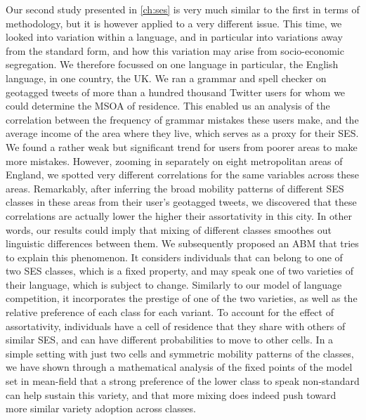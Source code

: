 \documentclass[../thesis.tex]{subfiles}
\begin{document}
Our second study presented in \cref{ch:ses} is very much similar to the first in terms
of methodology, but it is however applied to a very different issue. This time, we
looked into variation within a language, and in particular into variations away from the
standard form, and how this variation may arise from socio-economic segregation. We
therefore focussed on one language in particular, the English language, in one country,
the UK. We ran a grammar and spell checker on geotagged tweets of more than a hundred
thousand Twitter users for whom we could determine the \ac{MSOA} of residence. This
enabled us an analysis of the correlation between the frequency of grammar mistakes
these users make, and the average income of the area where they live, which serves as a
proxy for their \ac{SES}. We found a rather weak but significant trend for users from
poorer areas to make more mistakes. However, zooming in separately on eight metropolitan
areas of England, we spotted very different correlations for the same variables across
these areas. Remarkably, after inferring the broad mobility patterns of different
\ac{SES} classes in these areas from their user's geotagged tweets, we discovered that
these correlations are actually lower the higher their assortativity in this city. In
other words, our results could imply that mixing of different classes smoothes out
linguistic differences between them. We subsequently proposed an \ac{ABM} that tries to
explain this phenomenon. It considers individuals that can belong to one of two \ac{SES}
classes, which is a fixed property, and may speak one of two varieties of their
language, which is subject to change. Similarly to our model of language competition, it
incorporates the prestige of one of the two varieties, as well as the relative
preference of each class for each variant. To account for the effect of assortativity,
individuals have a cell of residence that they share with others of similar \ac{SES},
and can have different probabilities to move to other cells. In a simple setting with
just two cells and symmetric mobility patterns of the classes, we have shown through a
mathematical analysis of the fixed points of the model set in mean-field that a strong
preference of the lower class to speak non-standard can help sustain this variety, and
that more mixing does indeed push toward more similar variety adoption across classes.
\end{document}

